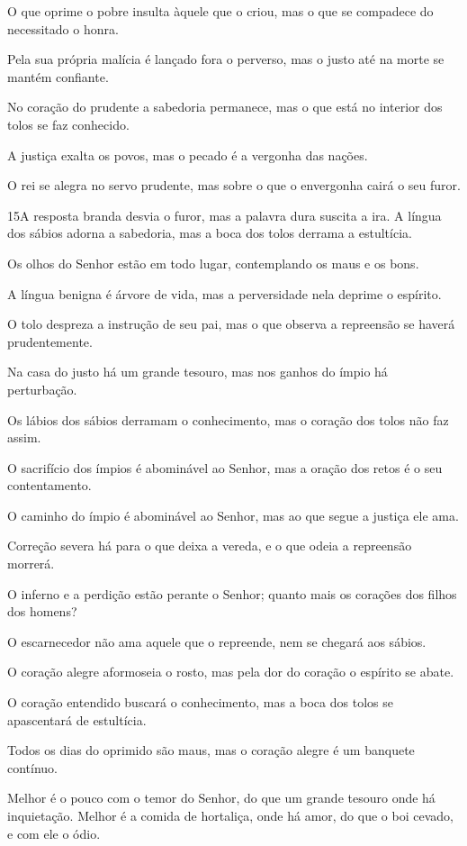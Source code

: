 O que oprime o pobre insulta àquele que o criou, mas o que se
compadece do necessitado o honra.

Pela sua própria malícia é lançado fora o perverso, mas o justo
até na morte se mantém confiante.

No coração do prudente a sabedoria permanece, mas o que está no
interior dos tolos se faz conhecido.

A justiça exalta os povos, mas o pecado é a vergonha das nações.

O rei se alegra no servo prudente, mas sobre o que o envergonha
cairá o seu furor.

\medskip

\lettrine{15}{}A resposta branda desvia o furor, mas a palavra
dura suscita a ira.  A língua dos sábios adorna a
sabedoria, mas a boca dos tolos derrama a estultícia.

Os olhos do Senhor estão em todo lugar, contemplando os maus e os
bons.

A língua benigna é árvore de vida, mas a perversidade nela deprime
o espírito.

O tolo despreza a instrução de seu pai, mas o que observa a
repreensão se haverá prudentemente.

Na casa do justo há um grande tesouro, mas nos ganhos do ímpio há
perturbação.

Os lábios dos sábios derramam o conhecimento, mas o coração dos
tolos não faz assim.

O sacrifício dos ímpios é abominável ao Senhor, mas a oração dos
retos é o seu contentamento.

O caminho do ímpio é abominável ao Senhor, mas ao que segue a
justiça ele ama.

Correção severa há para o que deixa a vereda, e o que odeia a
repreensão morrerá.

O inferno e a perdição estão perante o Senhor; quanto mais os
corações dos filhos dos homens?

O escarnecedor não ama aquele que o repreende, nem se chegará aos
sábios.

O coração alegre aformoseia o rosto, mas pela dor do coração o
espírito se abate.

O coração entendido buscará o conhecimento, mas a boca dos tolos
se apascentará de estultícia.

Todos os dias do oprimido são maus, mas o coração alegre é um
banquete contínuo.

Melhor é o pouco com o temor do Senhor, do que um grande tesouro
onde há inquietação. Melhor é a comida de hortaliça, onde há
amor, do que o boi cevado, e com ele o ódio.

